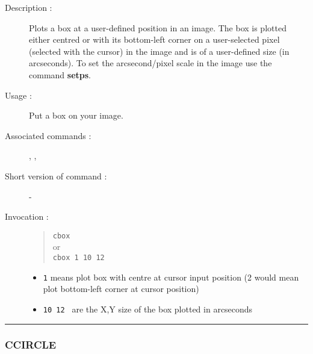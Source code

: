 \begin{description}

\item[Description :] Plots a box at a user-defined position in an image.  The
box is plotted either centred or with its bottom-left corner on a user-selected
pixel (selected with the cursor) in the image and is of a user-defined
size (in arcseconds).  To set the arcsecond/pixel scale in the image
use the command {\bf setps}.

\item[Usage :] Put a box on your image.
\item[Associated commands :] {\tt {}}, 
{\tt {}}, {\tt {}}
\item[Short version of command :] -
\item[Invocation :]

\begin{quote}{\tt  cbox }\\
or \\
{\tt cbox 1 10 12 }
\end{quote}

\begin{itemize}

\item {\tt 1} means plot box with centre at cursor input position
(2 would mean plot bottom-left corner at cursor position)
\item {\tt 10 12 } are the X,Y size of the box plotted in arcseconds

\end{itemize}

\end{description}

\hrule 
\subsubsection*{\label{CCIRCLE}CCIRCLE}

